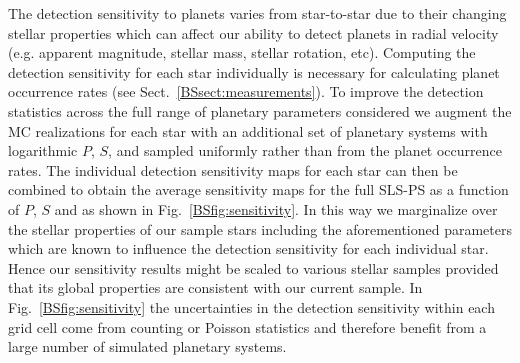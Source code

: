 The detection sensitivity to planets varies from star-to-star due to their changing stellar
properties which can affect our ability to detect planets in radial velocity (e.g. apparent magnitude,
stellar mass, stellar rotation, etc).
Computing the detection sensitivity for each star individually is necessary for calculating planet
occurrence rates (see Sect.~\ref{BSsect:measurements}). To improve the detection statistics across the
full range of planetary parameters considered we augment the MC realizations for each star with an additional
set of planetary systems with logarithmic $P$, $S$, and \msini{} sampled uniformly rather than from the
planet occurrence rates. The individual detection sensitivity maps for each star can then be combined
to obtain the average sensitivity maps for the full
SLS-PS as a function of $P$, $S$ and \msini{} as shown in Fig.~\ref{BSfig:sensitivity}.
In this way we marginalize over the stellar properties of our sample stars including
the aforementioned parameters which are known to influence the detection sensitivity for each individual
star. Hence our sensitivity results might be scaled to various stellar samples provided that its global
properties are consistent with our current sample. In Fig.~\ref{BSfig:sensitivity}
the uncertainties in the detection sensitivity within each grid cell come from counting or Poisson
statistics and therefore benefit from a large number of simulated planetary systems. \\

